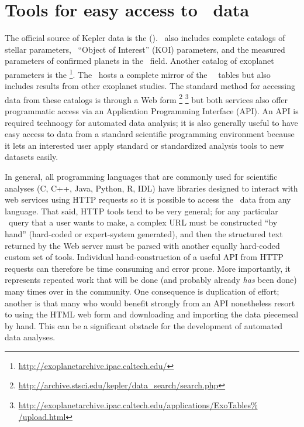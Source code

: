 \documentclass[letterpaper,12pt,preprint]{hack_aastex}
\begin{document}
\section{Tools for easy access to \Kepler\ data}

The official source of Kepler data is the
 (\MAST).
\MAST\ also includes complete catalogs of stellar parameters, \Kepler\
``Object of Interest'' (KOI) parameters, and the measured parameters of
confirmed planets in the \Kepler\ field.
Another catalog of exoplanet parameters is the
%
\footnote{\url{http://exoplanetarchive.ipac.caltech.edu/}}.
The \EA\ hosts a complete mirror of the \MAST\ \Kepler\ tables but
also includes results from other exoplanet studies.
The standard method for accessing data from these catalogs is through a Web
form%
\footnote{\url{http://archive.stsci.edu/kepler/data\_search/search.php}}%
\footnote{\url{http://exoplanetarchive.ipac.caltech.edu/applications/ExoTables%
/upload.html}}
but both services also offer programmatic access via an Application
Programming Interface (API).
An API is required technoogy for automated data analysis;
it is also generally useful to have easy access to data from a standard
scientific programming environment because it lets an interested user apply
standard or standardized analysis tools to new datasets easily.

In general, all programming languages that are commonly used for scientific
analyses (C, C++, Java, Python, R, IDL) have
libraries designed to interact with web services using HTTP requests so it is
possible to access the \Kepler\ data from any language.
That said, HTTP tools tend to be very general;
for any particular \Kepler\ query that a user wants to make,
a complex URL must be constructed ``by hand'' (hard-coded or expert-system
generated), and then the structured text returned by the Web server must be
parsed with another equally hard-coded custom set of tools.
Individual hand-construction of a useful API from HTTP requests can therefore
be time consuming and error prone.
More importantly, it represents repeated work that will be done (and probably
already \emph{has} been done) many times over in the community.
One consequence is duplication of effort; another is that many who would
benefit strongly from an API nonetheless resort to using the HTML web form
and downloading and importing the data piecemeal by hand.
This can be a significant obstacle for the development of automated data
analyses.
\end{document}
